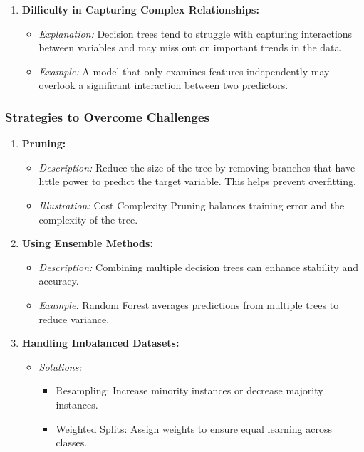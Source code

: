 \documentclass[aspectratio=169]{beamer}
\begin{document}
\begin{frame}[fragile]
\begin{enumerate}
        \item \textbf{Difficulty in Capturing Complex Relationships:}
            \begin{itemize}
                \item \textit{Explanation:} Decision trees tend to struggle with capturing interactions between variables and may miss out on important trends in the data.
                \item \textit{Example:} A model that only examines features independently may overlook a significant interaction between two predictors.
            \end{itemize}
    \end{enumerate}
\end{frame}

\begin{frame}[fragile]
    \frametitle{Strategies to Overcome Challenges}

    \begin{enumerate}
        \item \textbf{Pruning:}
            \begin{itemize}
                \item \textit{Description:} Reduce the size of the tree by removing branches that have little power to predict the target variable. This helps prevent overfitting.
                \item \textit{Illustration:} Cost Complexity Pruning balances training error and the complexity of the tree.
            \end{itemize}

        \item \textbf{Using Ensemble Methods:}
            \begin{itemize}
                \item \textit{Description:} Combining multiple decision trees can enhance stability and accuracy.
                \item \textit{Example:} Random Forest averages predictions from multiple trees to reduce variance.
            \end{itemize}

        \item \textbf{Handling Imbalanced Datasets:}
            \begin{itemize}
                \item \textit{Solutions:}
                    \begin{itemize}
                        \item Resampling: Increase minority instances or decrease majority instances.
                        \item Weighted Splits: Assign weights to ensure equal learning across classes.
                    \end{itemize}
            \end{itemize}


\end{enumerate}
\end{frame}
\end{document}
